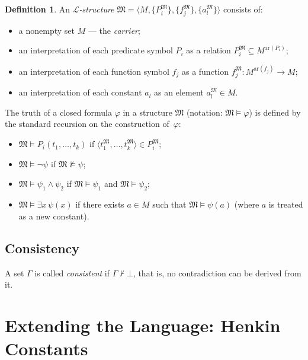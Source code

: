 \documentclass[12pt, a4paper]{article}
\theoremstyle{plain}
\theoremstyle{definition}
\newtheorem{definition}[theorem]{Definition}
\newcommand{\proves}{\vdash}
\renewcommand{\models}{\vDash}
\newcommand{\Lang}{\mathcal{L}}
\newcommand{\Struct}{\mathfrak{M}}
\newcommand{\tuple}[1]{\langle #1 \rangle}
\begin{document}
\begin{definition}
An \emph{$\Lang$-structure} $\Struct = \tuple{M, \{P_i^{\Struct}\}, \{f_j^{\Struct}\}, \{a_l^{\Struct}\}}$
consists of:
\begin{itemize}
  \item a nonempty set $M$ --- the \emph{carrier};
  \item an interpretation of each predicate symbol $P_i$ as a relation
        $P_i^{\Struct} \subseteq M^{\text{ar}(P_i)}$;
  \item an interpretation of each function symbol $f_j$ as a function
        $f_j^{\Struct}\colon M^{\text{ar}(f_j)} \to M$;
  \item an interpretation of each constant $a_l$ as an element $a_l^{\Struct} \in M$.
\end{itemize}
\end{definition}

The truth of a closed formula $\varphi$ in a structure $\Struct$
(notation: $\Struct \models \varphi$) is defined by the standard
recursion on the construction of~$\varphi$:
\begin{itemize}
  \item $\Struct \models P_i(t_1,\ldots,t_k)$ if
        $\tuple{t_1^{\Struct},\ldots,t_k^{\Struct}} \in P_i^{\Struct}$;
  \item $\Struct \models \neg\psi$ if $\Struct \not\models \psi$;
  \item $\Struct \models \psi_1 \wedge \psi_2$ if
        $\Struct \models \psi_1$ and $\Struct \models \psi_2$;
  \item $\Struct \models \exists x\,\psi(x)$ if there exists $a \in M$ such
        that $\Struct \models \psi(a)$ (where $a$ is treated as a new constant).
\end{itemize}

\subsection{Consistency}

A set $\Gamma$ is called \emph{consistent} if $\Gamma \not\proves \bot$,
that is, no contradiction can be derived from it.

\section{Extending the Language: Henkin Constants}
\end{document}
